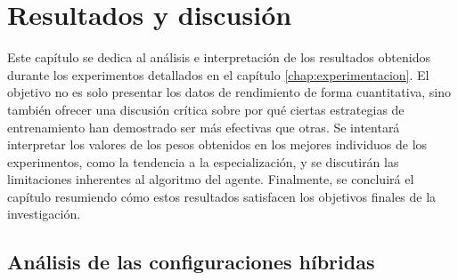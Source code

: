 \chapter{Resultados y discusión} \label{chap:resultados}

Este capítulo se dedica al análisis e interpretación de los resultados obtenidos durante los experimentos detallados en el capítulo \ref{chap:experimentacion}. El objetivo no es solo presentar los datos de rendimiento de forma cuantitativa, sino también ofrecer una discusión crítica sobre por qué ciertas estrategias de entrenamiento han demostrado ser más efectivas que otras. Se intentará interpretar los valores de los pesos obtenidos en los mejores individuos de los experimentos, como la tendencia a la especialización, y se discutirán las limitaciones inherentes al algoritmo del agente. Finalmente, se concluirá el capítulo resumiendo cómo estos resultados satisfacen los objetivos finales de la investigación.

\section{Análisis de las configuraciones híbridas} \label{sec:analisis_configuraciones_hibridas}

